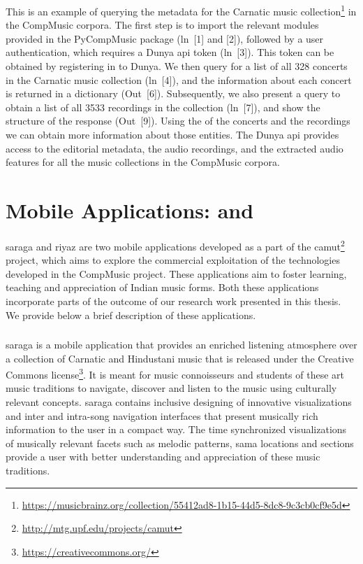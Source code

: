 This is an example of querying the metadata for the Carnatic music collection\footnote{\url{https://musicbrainz.org/collection/55412ad8-1b15-44d5-8dc8-9c3cb0cf9e5d}} in the CompMusic corpora. The first step is to import the relevant modules provided in the PyCompMusic package (ln~[1] and [2]), followed by a user authentication, which requires a Dunya \acrshort{api} token (ln~[3]). This token can be obtained by registering in to Dunya. We then query for a list of all 328 concerts in the Carnatic music collection (ln~[4]), and the information about each concert is returned in a dictionary (Out~[6]). Subsequently, we also present a query to obtain a list of all 3533 recordings in the collection (ln~[7]), and show the structure of the response (Out~[9]). Using the  of the concerts and the recordings we can obtain more information about those entities. The Dunya \acrshort{api} provides access to the editorial metadata, the audio recordings, and the extracted audio features for all the music collections in the CompMusic corpora.

\section{Mobile Applications:  and }
\label{sec:mobile_apps_camut}

\gls{saraga} and \gls{riyaz} are two mobile applications developed as a part of the \gls{camut}\footnote{\url{http://mtg.upf.edu/projects/camut}} project, which aims to explore the commercial exploitation of the technologies developed in the CompMusic project. These applications aim to foster learning, teaching and appreciation of Indian music forms. Both these applications incorporate parts of the outcome of our research work presented in this thesis. We provide below a brief description of these applications. 

\subsubsection{}
\label{sec:saraga}

\Gls{saraga} is a mobile application that provides an enriched listening atmosphere over a collection of Carnatic and Hindustani music that is released under the Creative Commons license\footnote{\url{https://creativecommons.org/}}. It is meant for music connoisseurs and students of these art music traditions to navigate, discover and listen to the music using culturally relevant concepts. \gls{saraga} contains inclusive designing of innovative visualizations and inter and intra-song navigation interfaces that present musically rich information to the user in a compact way. The time synchronized visualizations of musically relevant facets such as melodic patterns, \gls{sama} locations and sections provide a user with better understanding and appreciation of these music traditions.

